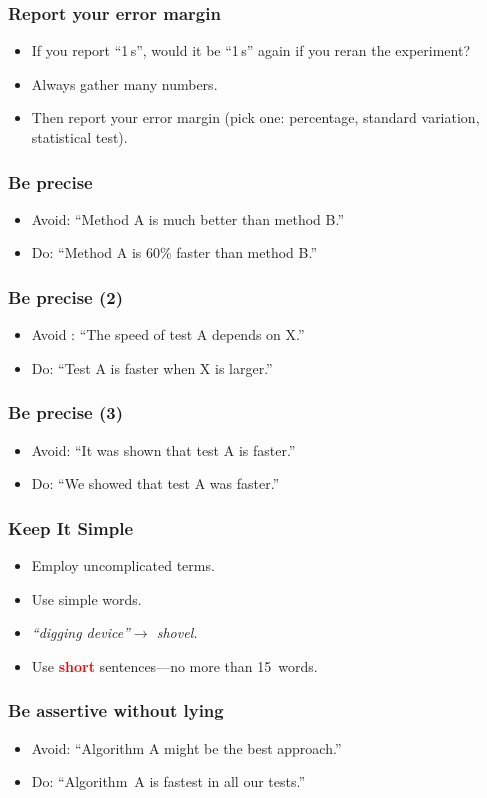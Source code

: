 \documentclass[handout]{beamer}
\newcommand{\vimportant}[1]{\textcolor{red}{\textbf{#1}}}
\begin{document}
\frame
{
  \frametitle{Report your error margin}
 \begin{itemize}
  \item<1->  If you report ``1\,s'', would it be ``1\,s'' again if you reran the experiment?
  \item<2->  Always gather many numbers.
  \item<3->  Then report your error margin (pick one: percentage, standard variation, statistical test).
 \end{itemize}
 }

\frame
{
  \frametitle{Be precise}
  \begin{itemize}
  \item<1->  Avoid: ``Method A is much better than method B.''
  \item<2->  Do: ``Method A is 60\% faster than method B.''
 \end{itemize}
 }

 \frame
{
  \frametitle{Be precise (2)}
  \begin{itemize}
  \item<1-> Avoid : ``The speed of test A depends on X.''
  \item<2->  Do: ``Test A is faster when X is larger.''
 \end{itemize}
 }

 \frame
{
  \frametitle{Be precise (3)}
  \begin{itemize}
 \item<1->           Avoid: ``It was shown that test A is faster.''
  \item<2-> Do: ``We showed that test A was faster.''
 \end{itemize}
 }



\frame
{
  \frametitle{Keep It Simple}
  \begin{itemize}
  \item<1->  Employ uncomplicated terms.
  \item<2->  Use simple words.
  \item<3-> \emph{``digging device''$\to$  shovel.}
    \item<4->  Use \vimportant{short} sentences---no more than 15~words.
 \end{itemize}
 }


\frame
{
  \frametitle{Be assertive without lying}
  \begin{itemize}
  \item<1-> Avoid: ``Algorithm A might be the best approach.''
  \item<2-> Do: ``Algorithm~A is fastest in all our tests.''
 \end{itemize}
 }
\end{document}
